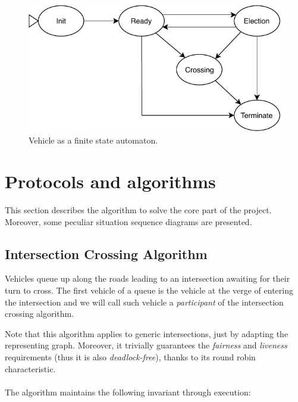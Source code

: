 \documentclass{memoir}
\begin{document}
\begin{figure}
	\centering
	\includegraphics[width=0.8\linewidth]{vehicle_automaton.pdf}
	\caption{Vehicle as a finite state automaton.}
	\label{fig:vehicle-automaton}
\end{figure}

\section{Protocols and algorithms}
This section describes the algorithm to solve the core part of the project. Moreover, some peculiar situation sequence diagrams are presented.

\subsection{Intersection Crossing Algorithm}\label{sec:intersection-crossing-algorithm}
Vehicles queue up along the roads leading to an intersection awaiting for their turn to cross. The first vehicle of a queue is the vehicle at the verge of entering the intersection and we will call such vehicle a \emph{participant} of the intersection crossing algorithm.

Note that this algorithm applies to generic intersections, just by adapting the representing graph. Moreover, it trivially guarantees the \emph{fairness} and \emph{liveness} requirements (thus it is also \emph{deadlock-free}), thanks to its round robin characteristic.
\\\\
\noindent
The algorithm maintains the following invariant through execution:
\end{document}
